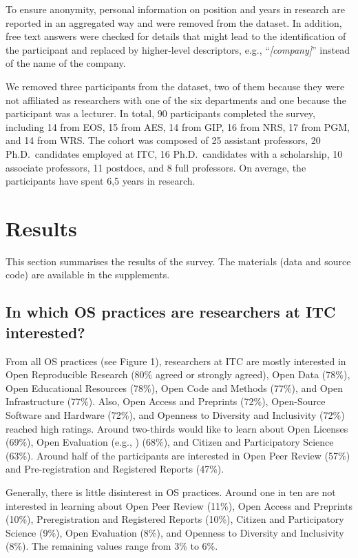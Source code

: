 \documentclass[gc, manuscript]{copernicus}
\begin{document}
To ensure anonymity, personal information on position and years in
research are reported in an aggregated way and were removed from the
dataset. In addition, free text answers were checked for details that
might lead to the identification of the participant and replaced by
higher-level descriptors, e.g., ``\textit{[company]}'' instead of the
name of the company.

We removed three participants from the dataset, two of them because they
were not affiliated as researchers with one of the six departments and
one because the participant was a lecturer. In total, 90 participants
completed the survey, including 14 from EOS, 15 from AES, 14 from GIP,
16 from NRS, 17 from PGM, and 14 from WRS. The cohort was composed of 25
assistant professors, 20 Ph.D.~candidates employed at ITC, 16
Ph.D.~candidates with a scholarship, 10 associate professors, 11
postdocs, and 8 full professors. On average, the participants have spent
6,5 years in research.

\section{Results}

This section summarises the results of the survey. The materials (data
and source code) are available in the supplements.

\subsection{In which OS practices are researchers at ITC interested?}

From all OS practices (see Figure 1), researchers at ITC are mostly
interested in Open Reproducible Research (80\% agreed or strongly
agreed), Open Data (78\%), Open Educational Resources (78\%), Open Code
and Methods (77\%), and Open Infrastructure (77\%). Also, Open Access
and Preprints (72\%), Open-Source Software and Hardware (72\%), and
Openness to Diversity and Inclusivity (72\%) reached high ratings.
Around two-thirds would like to learn about Open Licenses (69\%), Open
Evaluation (e.g.,
\href{https://sfdora.org/}{\color{blue}{San Francisco Declaration on Research Assessment}})
(68\%), and Citizen and Participatory Science (63\%). Around half of the
participants are interested in Open Peer Review (57\%) and
Pre-registration and Registered Reports (47\%).

Generally, there is little disinterest in OS practices. Around one in
ten are not interested in learning about Open Peer Review (11\%), Open
Access and Preprints (10\%), Preregistration and Registered Reports
(10\%), Citizen and Participatory Science (9\%), Open Evaluation (8\%),
and Openness to Diversity and Inclusivity (8\%). The remaining values
range from 3\% to 6\%.
\end{document}
